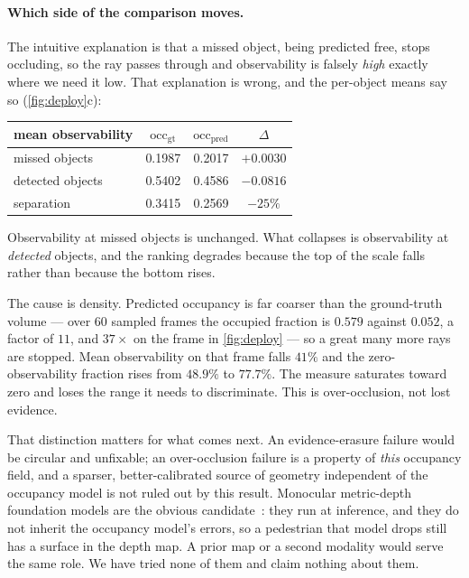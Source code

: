\documentclass[10pt,twocolumn,letterpaper]{article}
\begin{document}
\paragraph{Which side of the comparison moves.} The intuitive explanation
is that a missed object, being predicted free, stops occluding, so the ray
passes through and observability is falsely \emph{high} exactly where we
need it low. That explanation is wrong, and the per-object means say so
(\cref{fig:deploy}c):
\begin{center}\small
\begin{tabular}{lccc}
\toprule
mean observability & $\text{occ}_{\text{gt}}$ & $\text{occ}_{\text{pred}}$ & $\Delta$ \\
\midrule
missed objects   & 0.1987 & 0.2017 & $+0.0030$ \\
detected objects & 0.5402 & 0.4586 & $\mathbf{-0.0816}$ \\
\midrule
separation       & 0.3415 & 0.2569 & $-25\%$ \\
\bottomrule
\end{tabular}
\end{center}
Observability at missed objects is unchanged. What collapses is
observability at \emph{detected} objects, and the ranking degrades because
the top of the scale falls rather than because the bottom rises.

The cause is density. Predicted occupancy is far coarser than the
ground-truth volume --- over 60 sampled frames the occupied fraction is
$0.579$ against $0.052$, a factor of $11$, and $37\times$ on the frame in
\cref{fig:deploy} --- so a great many more rays are stopped. Mean
observability on that frame falls $41\%$ and the zero-observability
fraction rises from $48.9\%$ to $77.7\%$. The measure saturates toward zero
and loses the range it needs to discriminate. This is over-occlusion, not
lost evidence.

That distinction matters for what comes next. An evidence-erasure failure
would be circular and unfixable; an over-occlusion failure is a property of
\emph{this} occupancy field, and a sparser, better-calibrated source of geometry independent of the
occupancy model is not ruled out by this result. Monocular metric-depth
foundation models are the obvious candidate~\cite{bochkovskii2024depthpro,
hu2024metric3dv2, depthanyprior2025}: they run at inference, and
they do not inherit the occupancy model's errors, so a pedestrian that
model drops still has a surface in the depth map. A prior map or a second
modality would serve the same role. We have tried none of them and claim
nothing about them.
\end{document}
